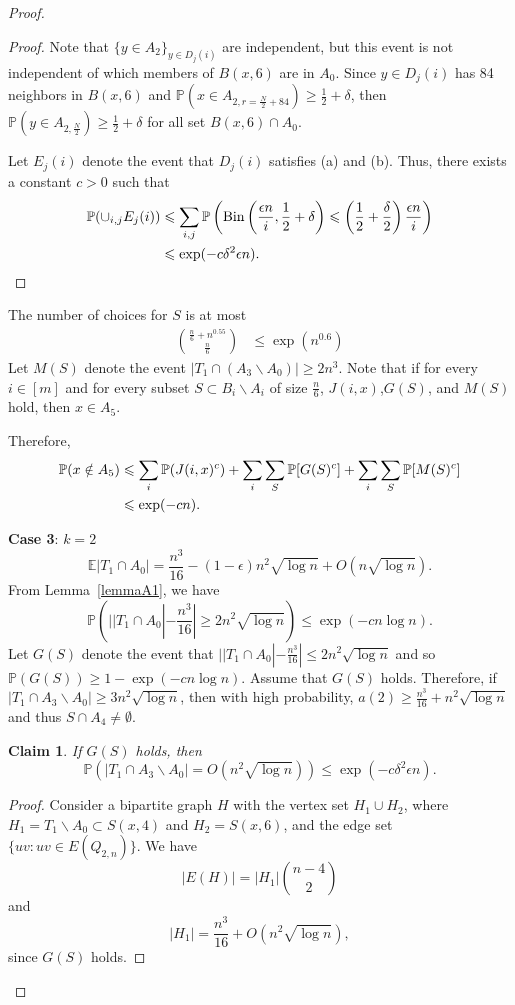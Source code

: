 \documentclass[reqno,11pt]{amsart}
\newtheorem{claim}[theorem]{Claim}
\renewcommand{\leq}{\leqslant}
\renewcommand{\geq}{\geqslant}
\begin{document}
\begin{proof}
\begin{proof}
Note that $\{ y \in A_2\}_{y \in D_j(i)}$ are independent, but this event is not independent of which members of $B(x,6)$ are in $A_0$. Since $y \in D_j(i)$ has 84 neighbors in $B(x,6)$ and $\mathbb{P}(x \in A_{2,r=\frac{N}{2}+84}) \geq \frac{1}{2}+\delta$, then $\mathbb{P}(y \in A_{2,\frac{N}{2}}) \geq \frac{1}{2}+\delta$ for all set $B(x,6) \cap A_0$.

Let $E_j(i)$ denote the event that $D_j(i)$ satisfies (a) and (b). Thus, there exists a constant $c>0$ such that
\begin{align*}
   \mathbb{P}(\cup_{i,j}E_j(i)) & \leq \sum_{i,j}\mathbb{P}\left(\text{Bin}\left(\frac{\epsilon n}{i},\frac{1}{2}+\delta \right) \leq \left(\frac{1}{2}+\frac{\delta}{2} \right)\frac{\epsilon n}{i} \right) \\
   & \leq  \exp(-c\delta^2 \epsilon n). \qedhere
\end{align*}

\end{proof}

The number of choices for $S$ is at most
\begin{align*}
    \binom{\frac{n}{6}+n^{0.55}}{\frac{n}{6}} &\leq \exp(n^{0.6})
\end{align*}
Let $M(S)$ denote the event $|T_1\cap (A_3 \backslash A_0)| \geq 2n^3$. Note that if for every $i \in [m]$ and for every subset $S \subset B_i \backslash A_i$ of size $\frac{n}{6}$, $J(i,x)$,$G(S)$, and $M(S)$ hold, then $x \in A_5$. 

Therefore,
\begin{align*}
   \mathbb{P}(x \notin A_5) &\leq \sum_{i}\mathbb{P}(J(i,x)^c) +\sum_{i}\sum_{S}\mathbb{P}[G(S)^c]+\sum_{i}\sum_{S}\mathbb{P}[M(S)^c]\\
      & \leq \exp(-cn). \qedhere
\end{align*}


\textbf{Case 3}: $k=2$
$$\mathbb{E}|T_1 \cap A_0|=\frac{n^3}{16}-(1-\epsilon)n^2 \sqrt{\log n}+ O(n \sqrt{\log n}). $$
From Lemma~\ref{lemmaA1}, we have 
$$\mathbb{P}(||T_1 \cap A_0|-\frac{n^3}{16}| \geq 2n^2 \sqrt{\log n}) \leq \exp(-cn \log n).$$
Let $G(S)$ denote the event that $||T_1 \cap A_0|-\frac{n^3}{16}| \leq 2n^2 \sqrt{\log n}$ and so $\mathbb{P}(G(S)) \geq 1-\exp(-cn \log n)$. Assume that $G(S)$ holds. Therefore, if $|T_1 \cap A_3 \backslash A_0| \geq 3n^2 \sqrt{\log n}$, then with high probability, $a(2) \geq \frac{n^3}{16}+n^2 \sqrt{\log n}$ and thus $S\cap A_4 \neq \emptyset.$

\begin{claim} If $G(S)$ holds, then 
$$\mathbb{P}(|T_1 \cap A_3 \backslash A_0|=O(n^2 \sqrt{\log n})) \leq \exp(-c\delta^2\epsilon n).$$
\end{claim}
\begin{proof} 
Consider a bipartite graph $H$ with the vertex set $H_1 \cup H_2$, where $H_1=T_1 \backslash A_0 \subset S(x,4)$ and $H_2=S(x,6)$, and the edge set $\{uv: uv \in E(Q_{2,n}) \}$. We have 
$$|E(H)|=|H_1|\binom{n-4}{2}$$ and 
$$|H_1|=\frac{n^3}{16}+O(n^2 \sqrt{\log n}),$$ since $G(S)$ holds.


\end{proof}
\end{proof}
\end{document}
